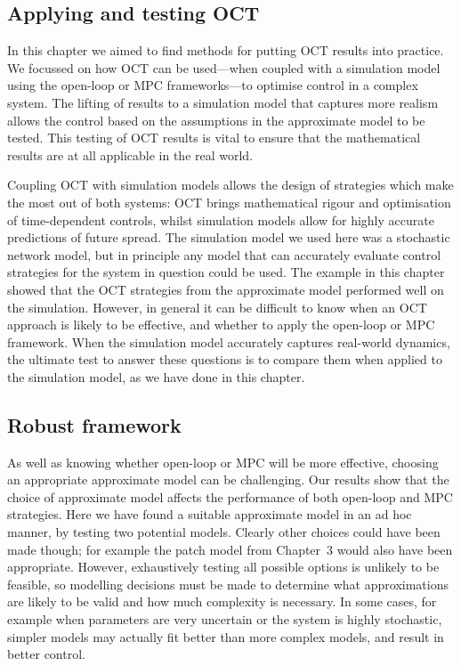 \subsection{Applying and testing OCT}

In this chapter we aimed to find methods for putting OCT results into practice. We focussed on how OCT can be used---when coupled with a simulation model using the open-loop or MPC frameworks---to optimise control in a complex system. The lifting of results to a simulation model that captures more realism allows the control based on the assumptions in the approximate model to be tested. This testing of OCT results is vital to ensure that the mathematical results are at all applicable in the real world.

Coupling OCT with simulation models allows the design of strategies which make the most out of both systems: OCT brings mathematical rigour and optimisation of time-dependent controls, whilst simulation models allow for highly accurate predictions of future spread. The simulation model we used here was a stochastic network model, but in principle any model that can accurately evaluate control strategies for the system in question could be used. The example in this chapter showed that the OCT strategies from the approximate model performed well on the simulation. However, in general it can be difficult to know when an OCT approach is likely to be effective, and whether to apply the open-loop or MPC framework. When the simulation model accurately captures real-world dynamics, the ultimate test to answer these questions is to compare them when applied to the simulation model, as we have done in this chapter.

\subsection{Robust framework}

As well as knowing whether open-loop or MPC will be more effective, choosing an appropriate approximate model can be challenging. Our results show that the choice of approximate model affects the performance of both open-loop and MPC strategies. Here we have found a suitable approximate model in an ad hoc manner, by testing two potential models. Clearly other choices could have been made though; for example the patch model from Chapter~3 would also have been appropriate. However, exhaustively testing all possible options is unlikely to be feasible, so modelling decisions must be made to determine what approximations are likely to be valid and how much complexity is necessary. In some cases, for example when parameters are very uncertain or the system is highly stochastic, simpler models may actually fit better than more complex models, and result in better control.

